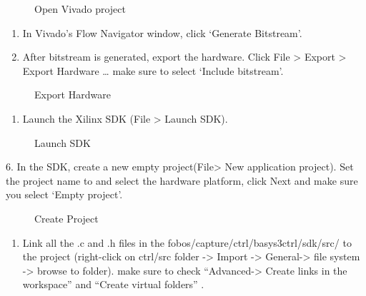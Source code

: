 \documentclass[letterpaper,10pt,english]{sphinxmanual}
\begin{document}
\begin{figure}[htbp]
\centering
\capstart

\noindent{}
\caption{Open Vivado project}\label{\detokenize{setup:id1}}\end{figure}
\begin{enumerate}
%
\setcounter{enumi}{2}
\item {} 
In Vivado’s Flow Navigator window, click ‘Generate Bitstream’.

\item {} 
After bitstream is generated, export the hardware. Click File \textgreater{} Export \textgreater{} Export Hardware … make sure to select ‘Include bitstream’.

\end{enumerate}

\begin{figure}[htbp]
\centering
\capstart

\noindent{}
\caption{Export Hardware}\label{\detokenize{setup:id2}}\end{figure}
\begin{enumerate}
%
\setcounter{enumi}{4}
\item {} 
Launch the Xilinx SDK (File \textgreater{} Launch SDK).

\end{enumerate}

\begin{figure}[htbp]
\centering
\capstart

\noindent{}
\caption{Launch SDK}\label{\detokenize{setup:id3}}\end{figure}

6. In the SDK, create a new empty project(File\textgreater{} New application project). Set the project name to  and select
the hardware platform, click Next and make sure you select ‘Empty project’.

\begin{figure}[htbp]
\centering
\capstart

\noindent{}
\caption{Create Project}\label{\detokenize{setup:id4}}\end{figure}
\begin{enumerate}
%
\setcounter{enumi}{6}
\item {} 
Link all the .c and .h files in the fobos/capture/ctrl/basys3ctrl/sdk/src/ to the project
(right-click on ctrl/src folder -\textgreater{} Import -\textgreater{} General-\textgreater{} file system -\textgreater{} browse to folder).
make sure to check “Advanced-\textgreater{} Create links in the workspace” and “Create virtual folders” .

\end{enumerate}
\end{document}
